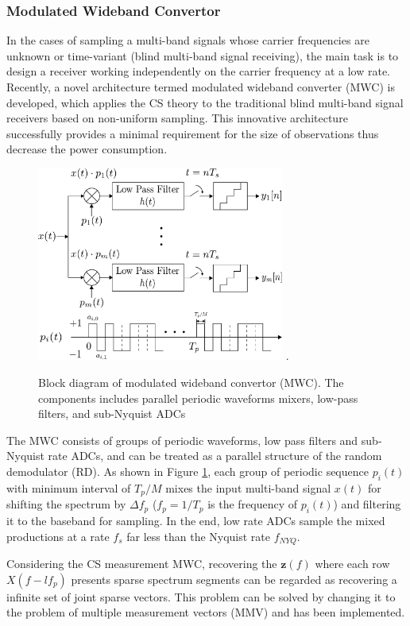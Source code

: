 \subsubsection{Modulated Wideband Convertor}
In the cases of sampling a multi-band signals whose carrier frequencies are unknown or time-variant (blind multi-band signal receiving), the main task is to design a receiver working independently on the carrier frequency at a low rate\cite{mishali2009blind}. Recently, a novel architecture termed modulated wideband converter (MWC) is developed, which applies the CS theory to the traditional blind multi-band signal receivers based on non-uniform sampling\cite{black1980time}. This innovative architecture successfully provides a minimal requirement for the size of observations\cite{mishali2010theory} thus decrease the power consumption.

\begin{figure}[!t]
\centering
\includegraphics[width=3.2in]{pictures/MWC1.pdf}
\DeclareGraphicsExtensions.
\caption{Block diagram of modulated wideband convertor (MWC). The components includes parallel periodic waveforms mixers, low-pass filters, and sub-Nyquist ADCs}\label{MWC1}
\end{figure}

The MWC consists of groups of periodic waveforms, low pass filters and sub-Nyquist rate ADCs, and can be treated as a parallel structure of the random demodulator (RD). As shown in Figure \ref{MWC1}, each group of periodic sequence $p_i(t)$ with minimum interval of $T_p/M$ mixes the input multi-band signal $x(t)$ for shifting the spectrum by $\Delta f_p$ ($f_p = 1/{T_p}$ is the frequency of $p_i(t)$) and filtering it to the baseband for sampling. In the end, low rate ADCs sample the mixed productions at a rate $f_s$ far less than the Nyquist rate $f_{NYQ}$.

Considering the CS measurement MWC, recovering the $\mathbf z(f)$ where each row $X(f-lf_p)$ presents sparse spectrum segments can be regarded as recovering a infinite set of joint sparse vectors. This problem can be solved by changing it to the problem of multiple measurement vectors (MMV)\cite{mishali2008reduce} and has been implemented. 

